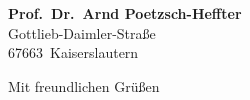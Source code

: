 \documentclass[10pt,a4paper]{scrlttr2}
\begin{document}
\begin{letter}{%
    \textbf{Prof.\ Dr.\ Arnd Poetzsch-Heffter}\\
    Gottlieb-Daimler-Straße\\
    67663~Kaiserslautern
  }

  \opening{}

  \lipsum[3-5]

  \clearpage

  \lipsum[3-8]

  \closing{Mit freundlichen Grüßen}
  
\end{letter}

\end{document}
